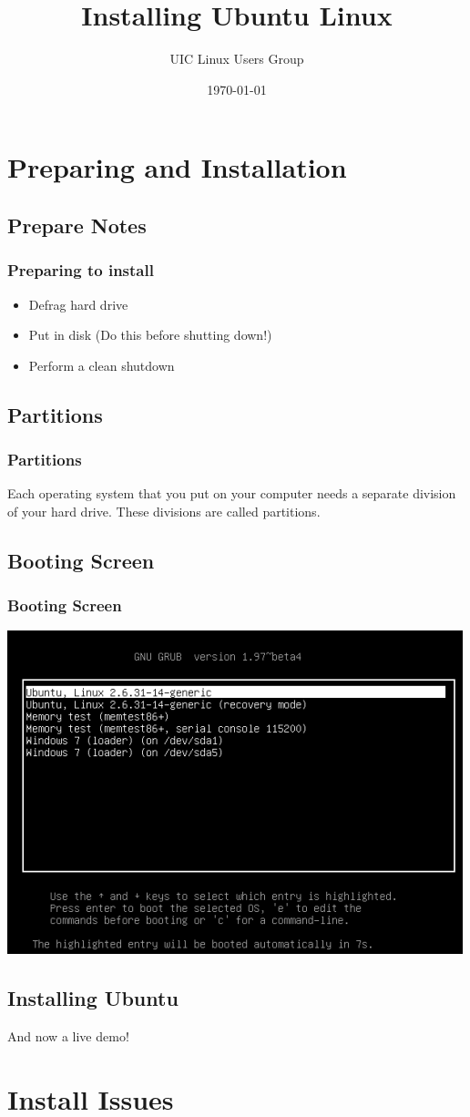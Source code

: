 \documentclass[hyperref={pdfpagelabels=false}]{beamer}
\title{Installing Ubuntu Linux}
\author{UIC Linux Users Group}
\date{\today}
\begin{document}
\frame{\titlepage}
\section{Preparing and Installation}
\subsection{Prepare Notes}
\frame
{
    \frametitle{Preparing to install}
    \begin{itemize}
    \item{Defrag hard drive}
	\item{Put in disk (Do this before shutting down!)}
    \item{Perform a clean shutdown}
    \end{itemize}
}
\subsection{Partitions}
\frame
{
	\frametitle{Partitions}
	Each operating system that you put on your computer needs a separate division of your hard drive. These divisions are called partitions.
}
\subsection{Booting Screen}
\frame
{
	\frametitle{Booting Screen}
    \includegraphics[totalheight=0.8\textheight]{grub.png}
}
\subsection{Installing Ubuntu}
\frame
{
	And now a live demo!
}
\section{Install Issues}
\end{document}
